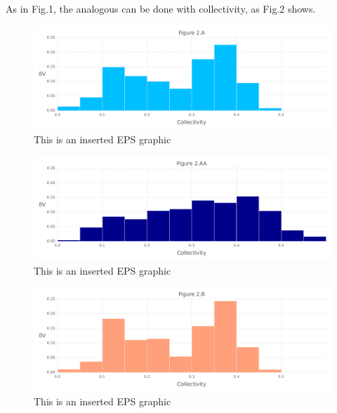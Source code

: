 \documentclass[10pt,letterpaper]{article}
\begin{document}
\clearpage
As in Fig.1, the analogous can be done with collectivity, as Fig.2 shows.

\begin{figure}[ht]
\begin{center}
\includegraphics[scale=0.5]{1m14/2afigure_very_hi-precision.pdf}
\caption{This is an inserted EPS graphic}
\label{fig3}
\end{center}
\end{figure}

\begin{figure}[ht]
\begin{center}
\includegraphics[scale=0.5]{1m14/2aafigure_very_hi-precision.pdf}
\caption{This is an inserted EPS graphic}
\label{fig4}
\end{center}
\end{figure}

\begin{figure}[ht]
\begin{center}
\includegraphics[scale=0.5]{1m14/2bfigure_very_hi-precision.pdf}
\caption{This is an inserted EPS graphic}
\label{fig5}
\end{center}
\end{figure}
\end{document}
